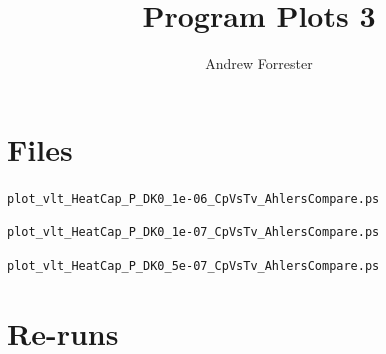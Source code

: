 \documentclass[11pt]{article}
\title{Program Plots 3}
\author{Andrew Forrester}
\begin{document}
\maketitle
\tableofcontents

\section{Files}

\squishlist
  \item \verb|plot_vlt_HeatCap_P_DK0_1e-06_CpVsTv_AhlersCompare.ps|
  \item \verb|plot_vlt_HeatCap_P_DK0_1e-07_CpVsTv_AhlersCompare.ps|
  \item \verb|plot_vlt_HeatCap_P_DK0_5e-07_CpVsTv_AhlersCompare.ps|
\squishend



\newpage
\section{Re-runs}
\end{document}
